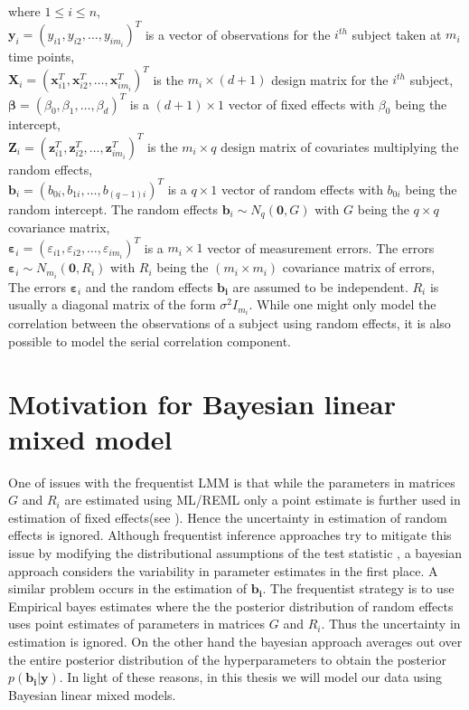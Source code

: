 where $1 \le i \le n$,\\
$\boldsymbol{y}_i = {(y_{i1}, y_{i2}, \ldots, y_{im_i})}^T$ is a vector of observations for the $i^{th}$ subject taken at $m_i$ time points,\\
$\boldsymbol{X}_i = {(\boldsymbol{x}_{i1}^T, \boldsymbol{x}_{i2}^T, \ldots, \boldsymbol{x}_{im_i}^T)}^T$ is the $m_i \times (d+1)$ design matrix for the $i^{th}$ subject,\\
$\boldsymbol{\beta} = {(\beta_0, \beta_1, \ldots, \beta_d)}^T$ is a $(d+1) \times 1$ vector of fixed effects with $\beta_0$ being the intercept,\\
$\boldsymbol{Z}_i = {(\boldsymbol{z}_{i1}^T, \boldsymbol{z}_{i2}^T, \ldots, \boldsymbol{z}_{im_i}^T)}^T$ is the $m_i \times q$ design matrix of covariates multiplying the random effects,\\
$\boldsymbol{b}_i = {(b_{0i}, b_{1i}, \ldots, b_{(q-1)i})}^T$ is a $q \times 1$ vector of random effects with $b_{0i}$ being the random intercept. The random effects $\boldsymbol{b}_i \sim N_q(\boldsymbol{0}, G)$ with $G$ being the $q \times q$ covariance matrix,\\ 
$\boldsymbol{\varepsilon}_{i} = {(\varepsilon_{i1}, \varepsilon_{i2}, \ldots, \varepsilon_{im_i})}^T$ is a $m_i \times 1$ vector of measurement errors. The errors $\boldsymbol{\varepsilon}_{i} \sim N_{m_i}(\boldsymbol{0}, R_i)$ with $R_i$ being the $(m_i \times m_i)$ covariance matrix of errors,\\

The errors $\boldsymbol{\varepsilon}_{i}$ and the random effects $\boldsymbol{b_i}$ are assumed to be independent. $R_i$ is usually a diagonal matrix of the form $\sigma^2I_{m_i}$. While one might only model the correlation between the observations of a subject using random effects, it is also possible to model the serial correlation component.

\section{Motivation for Bayesian linear mixed model}
\label{sec : blmm}
One of issues with the frequentist LMM is that while the parameters in matrices $G$ and $R_i$ are estimated using ML/REML only a point estimate is further used in estimation of fixed effects(see \cite[chap. 5]{verbeke_linear_2009}). Hence the uncertainty in estimation of random effects is ignored. Although frequentist inference approaches try to mitigate this issue by modifying the distributional assumptions of the test statistic \citep[pg. 56]{verbeke_linear_2009}, a bayesian approach considers the variability in parameter estimates in the first place. A similar problem occurs in the estimation of $\boldsymbol{b_i}$. The frequentist strategy is to use Empirical bayes estimates where the the posterior distribution of random effects uses point estimates of parameters in matrices $G$ and $R_i$. Thus the uncertainty in estimation is ignored. On the other hand the bayesian approach averages out over the entire posterior distribution of the hyperparameters to obtain the posterior $p(\boldsymbol{b_i}|\boldsymbol{y})$. In light of these reasons, in this thesis we will model our data using Bayesian linear mixed models.\\

